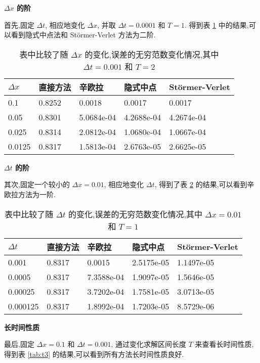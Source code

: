 \textbf{$\Delta x$ 的阶}

首先,固定 $\Delta t$, 相应地变化 $\Delta x$, 并取
$\Delta t = 0.0001$ 和 $T = 1$. 得到表 \ref{tab:dx3} 中的结果,可以看到隐式中点法和 St\"{o}rmer-Verlet 方法为二阶.

\begin{table}[h!]
  \centering
\caption{表中比较了随 $\Delta x$ 的变化,误差的无穷范数变化情况,其中 $\Delta t=0.001$ 和 $T=2$}
\begin{tabularx}{\linewidth}{XXXXX}
 \toprule[1.5pt]
 $\Delta x$ &直接方法 & 辛欧拉 & 隐式中点 & St\"{o}rmer-Verlet\\
 \midrule[1pt]
 0.1 & 0.8252 & 0.0018 & 0.0017 & 0.0017\\
 0.05 & 0.8301 & 5.0684e-04 & 4.2688e-04 & 4.2674e-04\\
 0.025 & 0.8314 & 2.0812e-04 & 1.0680e-04 & 1.0667e-04\\
 0.0125 & 0.8317 & 1.5813e-04 & 2.6763e-05 & 2.6625e-05\\
 \bottomrule[1.5pt]
\end{tabularx}
  \label{tab:dx3}
\end{table}

\textbf{$\Delta t$ 的阶}

其次,固定一个较小的 $\Delta x = 0.01$, 相应地变化 $\Delta t$, 得到了表 \ref{tab:dt3} 的结果,可以看到辛欧拉方法为一阶.

\begin{table}[h]
  \centering
\caption{表中比较了随 $\Delta t$ 的变化,误差的无穷范数变化情况,其中 $\Delta x=0.01$ 和 $T=1$}
\begin{tabularx}{\linewidth}{XXXXX}
 \toprule[1.5pt]
 $\Delta t$ &直接方法 & 辛欧拉 & 隐式中点 & St\"{o}rmer-Verlet\\
 \midrule[1pt]
 0.001 & 0.8317 & 0.0015 & 2.5175e-05 & 1.1497e-05 \\
 0.0005 & 0.8317 & 7.3588e-04 & 1.9097e-05 & 1.5646e-05 \\
 0.00025 & 0.8317 & 3.7202e-04 & 1.7581e-05 & 3.0713e-05 \\
 0.000125 & 0.8317 & 1.8992e-04 & 1.7203e-05 & 8.5729e-06 \\
 \bottomrule[1.5pt]
\end{tabularx}
  \label{tab:dt3}
\end{table}

\textbf{长时间性质}

最后,固定 $\Delta x = 0.1$ 和 $\Delta t = 0.001$, 通过变化求解区间长度 $T$ 来查看长时间性质,得到表 \ref{tab:t3} 的结果,可以看到所有方法长时间性质良好.

